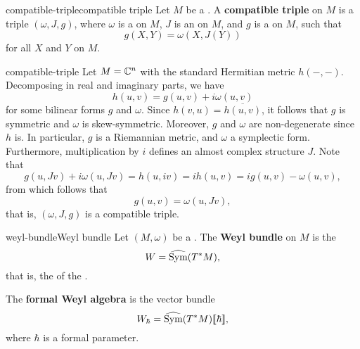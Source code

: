 \begin{topic}{compatible-triple}{compatible triple}
    Let $M$ be a . A \textbf{compatible triple} on $M$ is a triple $(\omega, J, g)$, where $\omega$ is a  on $M$, $J$ is an  on $M$, and $g$ is a  on $M$, such that
    \[ g(X, Y) = \omega(X, J(Y)) \]
    for all  $X$ and $Y$ on $M$.
\end{topic}

\begin{example}{compatible-triple}
    Let $M = \mathbb{C}^n$ with the standard Hermitian metric $h(-, -)$. Decomposing in real and imaginary parts, we have
    \[ h(u, v) = g(u, v) + i \omega(u, v) \]
    for some bilinear forms $g$ and $\omega$. Since $h(v, u) = \overline{h(u, v)}$, it follows that $g$ is symmetric and $\omega$ is skew-symmetric. Moreover, $g$ and $\omega$ are non-degenerate since $h$ is. In particular, $g$ is a Riemannian metric, and $\omega$ a symplectic form. Furthermore, multiplication by $i$ defines an almost complex structure $J$. Note that
    \[ g(u, Jv) + i \omega(u, Jv) = h(u, iv) = i h(u, v) = i g(u, v) - \omega(u, v) , \]
    from which follows that
    \[ g(u, v) = \omega(u, Jv) , \]
    that is, $(\omega, J, g)$ is a compatible triple.
\end{example}

\begin{topic}{weyl-bundle}{Weyl bundle}
    Let $(M, \omega)$ be a . The \textbf{Weyl bundle} on $M$ is the 
    \[ W = \widehat{\textup{Sym}}(T^*M) , \]
    that is, the   of the .
    
    The \textbf{formal Weyl algebra} is the vector bundle
    \[ W_\hbar = \widehat{\textup{Sym}}(T^*M) \llbracket \hbar \rrbracket , \]
    where $\hbar$ is a formal parameter.
\end{topic}

